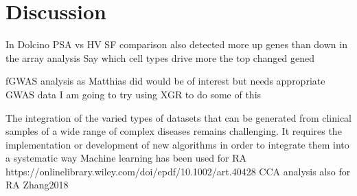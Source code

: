 





\section{Discussion}
%
In Dolcino PSA vs HV SF comparison also detected more up genes than down in the array analysis
Say which cell types drive more the top changed gened

fGWAS analysis as Matthias did would be of interest but needs appropriate GWAS data
I am going to try using XGR to do some of this 



The integration of the varied types of datasets that can be generated from clinical samples of a wide range of complex diseases remains challenging. It requires the implementation or development of new algorithms in order to integrate them into a systematic way
Machine learning has been used for RA https://onlinelibrary.wiley.com/doi/epdf/10.1002/art.40428
CCA analysis also for RA Zhang2018	
